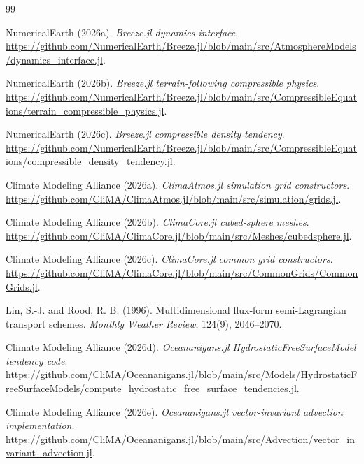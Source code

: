 \documentclass[11pt]{article}
\begin{document}
\begin{thebibliography}{99}

NumericalEarth (2026a).
\emph{Breeze.jl dynamics interface}.
\url{https://github.com/NumericalEarth/Breeze.jl/blob/main/src/AtmosphereModels/dynamics_interface.jl}.

NumericalEarth (2026b).
\emph{Breeze.jl terrain-following compressible physics}.
\url{https://github.com/NumericalEarth/Breeze.jl/blob/main/src/CompressibleEquations/terrain_compressible_physics.jl}.

NumericalEarth (2026c).
\emph{Breeze.jl compressible density tendency}.
\url{https://github.com/NumericalEarth/Breeze.jl/blob/main/src/CompressibleEquations/compressible_density_tendency.jl}.

Climate Modeling Alliance (2026a).
\emph{ClimaAtmos.jl simulation grid constructors}.
\url{https://github.com/CliMA/ClimaAtmos.jl/blob/main/src/simulation/grids.jl}.

Climate Modeling Alliance (2026b).
\emph{ClimaCore.jl cubed-sphere meshes}.
\url{https://github.com/CliMA/ClimaCore.jl/blob/main/src/Meshes/cubedsphere.jl}.

Climate Modeling Alliance (2026c).
\emph{ClimaCore.jl common grid constructors}.
\url{https://github.com/CliMA/ClimaCore.jl/blob/main/src/CommonGrids/CommonGrids.jl}.

Lin, S.-J. and Rood, R. B. (1996).
Multidimensional flux-form semi-Lagrangian transport schemes.
\emph{Monthly Weather Review}, 124(9), 2046--2070.

Climate Modeling Alliance (2026d).
\emph{Oceananigans.jl HydrostaticFreeSurfaceModel tendency code}.
\url{https://github.com/CliMA/Oceananigans.jl/blob/main/src/Models/HydrostaticFreeSurfaceModels/compute_hydrostatic_free_surface_tendencies.jl}.

Climate Modeling Alliance (2026e).
\emph{Oceananigans.jl vector-invariant advection implementation}.
\url{https://github.com/CliMA/Oceananigans.jl/blob/main/src/Advection/vector_invariant_advection.jl}.


\end{thebibliography}
\end{document}
